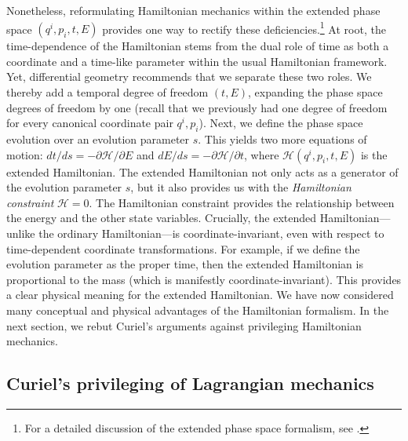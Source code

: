 \documentclass[12pt, english, twoside]{article} %
\begin{document}
Nonetheless, reformulating Hamiltonian mechanics within the extended phase space $(q^i, p_i, t, E)$ provides one way to rectify these deficiencies.\footnote{For a detailed discussion of the extended phase space formalism, see \textcites[]{Struckmeier}.} At root, the time-dependence of the Hamiltonian stems from the dual role of time as both a coordinate and a time-like parameter within the usual Hamiltonian framework. Yet, differential geometry recommends that we separate these two roles. We thereby add a temporal degree of freedom $(t, E) $, expanding the phase space degrees of freedom by one (recall that we previously had one degree of freedom for every canonical coordinate pair $q^i, p_i$). Next, we define the phase space evolution over an evolution parameter $s $. This yields two more equations of motion: $dt/ds = -\partial \mathcal{H}/ \partial E$ and $dE/ds = -\partial \mathcal{H}/ \partial t$, where $\mathcal{H}(q^i, p_i, t, E)$ is the extended Hamiltonian. The extended Hamiltonian not only acts as a generator of the evolution parameter $s$, but it also provides us with the \textit{Hamiltonian constraint} $\mathcal{H}=0$. The Hamiltonian constraint provides the relationship between the energy and the other state variables. Crucially, the extended Hamiltonian---unlike the ordinary Hamiltonian---is coordinate-invariant, even with respect to time-dependent coordinate transformations. For example, if we define the evolution parameter as the proper time, then the extended Hamiltonian is proportional to the mass (which is manifestly coordinate-invariant). This provides a clear physical meaning for the extended Hamiltonian. We have now considered many conceptual and physical advantages of the Hamiltonian formalism. In the next section, we rebut Curiel's \parencites*[]{Curiel} arguments against privileging Hamiltonian mechanics. 




\subsection{Curiel's privileging of Lagrangian mechanics}
\label{Curiel}

\end{document}
